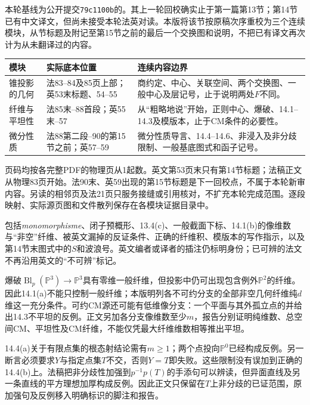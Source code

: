 本轮基线为公开提交\texttt{79c1100b}的。其上一轮回校确实止于第一篇第13节；第14节已有中文译文，但尚未接受本轮法英对读。本版将该节按原稿次序重校为三个连续模块，从节标题及附记至第15节之前的最后一个交换图和说明，不把已有译文再次计为从未翻译过的内容。

\begin{longtable}{@{}p{.17\linewidth}p{.23\linewidth}p{.48\linewidth}@{}}
\toprule 模块 & 实际底本位置 & 连续内容边界\\\midrule\endhead
锥投影的几何 & 法83--84及85页上部；英53末标题、54--55 & 商约定、中心、关联空间、两个交换图、一般中心及层记号，止于说明两处$F$不同。\\
纤维与平坦性 & 法85末--88首段；英55末--57 & 从“粗略地说”开始，正则中心、爆破、14.1--14.3及模版本，止于CM条件的必要性。\\
微分性质 & 法88第二段--90的第15节之前；英57--59 & 微分性质导言、14.4--14.6、非浸入及非分歧限制、一般基底图式和函子记号。\\
\bottomrule
\end{longtable}

页码均按各完整PDF的物理页从1起数。英文第53页末只有第14节标题；法稿正文从物理83页开始。法90末、英59出现的第15节标题是下一回校点，不属于本轮新审内容。另读的相邻页及法21页只服务接缝或引用核对，不扩充本轮完成范围。逐段映射、实际源页图和文件散列保存在各模块证据目录中。

包括\emph{monomorphisme}、闭子预概形、13.4(c)、一般截面下标、14.1(b)的像维数与“非空”纤维、被英文漏掉的反证条件、正确的纤维积、模版本的写作指示，以及第14节末图式中的$S$和波浪号。英文编者或译者的插注仍标明身份；已可辨的法文不再沿用英文的“不可辨”标记。

爆破$\operatorname{Bl}_p(\mathbb P^3)\to\mathbb P^3$具有零维一般纤维，但投影中仍可出现包含例外$\mathbb P^2$的纤维。因此14.1(a)不能只控制一般纤维；本版明列各不可约分支的全部非空几何纤维纯$d$维这一充分条件。可约CM源还可能有低维像分支：一个平面与其外孤立点的并给出14.3不平坦的反例。正文另加各分支像维数至少$m$，报告分别证明纯维数、总空间CM、平坦性及CM纤维，不能仅凭最大纤维维数相等推出平坦。

14.4(a)关于有限点集的根态射结论需有$m\geq1$；两个点投向$\mathbb P^0$已经构成反例。另一断言必须要求$Y$与指定点集$T$不交，否则$Y=T$即失败。这些限制没有误加到正确的14.4(b)上。法稿把非分歧性加强到$p^{-1}p(T)$的手添句可以辨读，但异面直线及另一条直线的平方理想加厚构成反例。因此正文只保留在$T$上非分歧的已证范围，原加强句及反例移入明确标识的脚注和报告。

